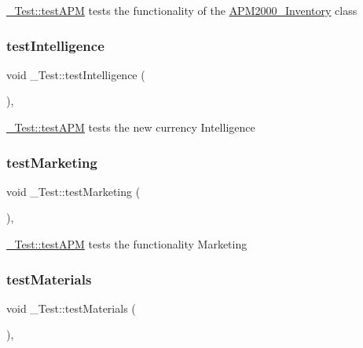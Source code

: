 \mbox{\hyperlink{class__Test_adb7f71ea12e1b02afd6b4d1f7d65c1eb}{\+\_\+\+Test\+::test\+A\+PM}} tests the functionality of the \mbox{\hyperlink{classAPM2000__Inventory}{A\+P\+M2000\+\_\+\+Inventory}} class 

\mbox{\label{class__Test_aa337b0ffaa271362d37b5ea92630b58d}} 
\subsubsection{\texorpdfstring{testIntelligence}{testIntelligence}}
{\footnotesize\ttfamily void \+\_\+\+Test\+::test\+Intelligence (\begin{DoxyParamCaption}{ }\end{DoxyParamCaption})\hspace{0.3cm}{\ttfamily [private]}, {\ttfamily [slot]}}



\mbox{\hyperlink{class__Test_adb7f71ea12e1b02afd6b4d1f7d65c1eb}{\+\_\+\+Test\+::test\+A\+PM}} tests the new currency Intelligence 

\mbox{\label{class__Test_a635f82c86b1c9c07ffd70a704a790311}} 
\subsubsection{\texorpdfstring{testMarketing}{testMarketing}}
{\footnotesize\ttfamily void \+\_\+\+Test\+::test\+Marketing (\begin{DoxyParamCaption}{ }\end{DoxyParamCaption})\hspace{0.3cm}{\ttfamily [private]}, {\ttfamily [slot]}}



\mbox{\hyperlink{class__Test_adb7f71ea12e1b02afd6b4d1f7d65c1eb}{\+\_\+\+Test\+::test\+A\+PM}} tests the functionality Marketing 

\mbox{\label{class__Test_ad5396e54792008660924db2e16edb614}} 
\subsubsection{\texorpdfstring{testMaterials}{testMaterials}}
{\footnotesize\ttfamily void \+\_\+\+Test\+::test\+Materials (\begin{DoxyParamCaption}{ }\end{DoxyParamCaption})\hspace{0.3cm}{\ttfamily [private]}, {\ttfamily [slot]}}




